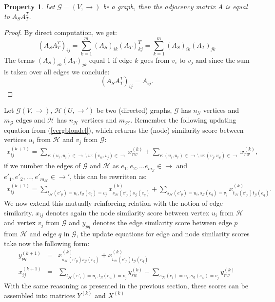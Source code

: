 \documentclass[a4paper,11pt]{report}
\newtheorem{property}[theorem]{Property}
\newcommand{\graf}{\mathscr{G}}
\newcommand{\grafeen}{\mathscr{H}}
\begin{document}
\begin{property}\label{adjancencyprop}
  Let $\graf =(V,\to)$ be a graph, then the adjacency matrix $A$ is equal to 
  $A_SA^T_T$.
\end{property}
\begin{proof}
  By direct computation, we get:
  $$(A_SA_T^T)_{ij} = \sum^m_{k=1}(A_S)_{ik}(A_T)^T_{kj} = \sum^m_{k=1}(A_S)_{ik}(A_T)_{jk}$$
The terms $(A_S)_{ik}(A_T)_{jk}$ equal $1$ if edge $k$ goes from $v_i$ to 
$v_j$ and since the sum is taken over all edges we conclude:
$$(A_SA_T^T)_{ij} = A_{ij}.$$
\end{proof}
Let  $\graf(V,\to)$, $\grafeen(U,\to')$ be two (directed) graphs, $\graf$ has $n_\graf$ vertices and $m_\graf$ edges and $\grafeen$ has $n_\grafeen$ vertices and $m_\grafeen$. 
Remember the following updating equation from (\ref{vergblondel}), which returns the 
(node) similarity score between vertices $u_i$ 
from $\grafeen$ and $v_j$ from $\graf$:
\begin{eqnarray*}
 x^{(k+1)}_{ij} = \sum_{r:(u_r,u_i)\in \to', w:(v_w,v_j) \in \to} x^{(k)}_{rw} +  \sum_{r:(u_i,u_r)\in \to', w:(v_j,v_w) \in \to} 
 x^{(k)}_{rw},
 \end{eqnarray*} 
if we number the edges of $\graf$ and $\grafeen$ as  $e_1, e_2, \ldots e_{m_\graf}  \in \to$ and $e'_1, e'_2, \ldots, e'_{m_\grafeen}  \in \to'$, this can be rewritten as:
 \begin{eqnarray*}
 x^{(k+1)}_{ij} = \sum_{t_\grafeen(e'_p)=u_i, t_\graf(e_q)=v_j} x^{(k)}_{s_\grafeen(e'_p)s_\graf(e_q)} +  \sum_{s_\grafeen(e'_p)=u_i, s_\graf(e_q)=v_j} 
 x^{(k)}_{t_\grafeen(e'_p)t_\graf(e_q)}.
 \end{eqnarray*} 
 We now extend this mutually reinforcing relation with the notion of edge 
 similarity. $x_{ij}$ denotes again the node similarity score between vertex $u_i$ from $\grafeen$ and vertex $v_j$ from $\graf$ 
 and $y_{pq}$ denotes the edge similarity score between edge $p$ from $\grafeen$ and edge $q$ in $\graf$, the update equations for edge and node similarity scores take now the 
 following form:
 \begin{eqnarray}
 y_{pq}^{(k+1)} &=& x^{(k)}_{s_\grafeen(e'_p)s_\graf(e_q)} + x^{(k)}_{t_\grafeen(e'_p)t_\graf(e_q)}\label{edge1}\\
 x^{(k+1)}_{ij} &=& \sum_{t_\grafeen(e'_r)=u_i, t_\graf(e_w)=v_j} y^{(k)}_{rw} +  \sum_{s_\grafeen(e_t)=u_i, s_\graf(e_w)=v_j} y^{(k)}_{rw} \label{edge2}
 \end{eqnarray} 
With the same 
 reasoning as presented in the previous section, these scores can be assembled into matrices $Y^{(k)}$ and $X^{(k)}$ 
\end{document}
